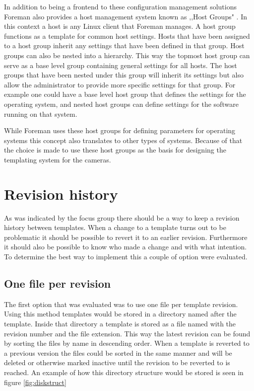 In addition to being a frontend to these configuration management solutions Foreman also provides a host management system known as ,,Host Groups" \cite{noauthor_foreman_nodate-1}. In this context a host is any Linux client that Foreman manages.
A host group functions as a template for common host settings.
Hosts that have been assigned to a host group inherit any settings that have been defined in that group.
Host groups can also be nested into a hierarchy.
This way the topmost host group can serve as a base level group containing general settings for all hosts.
The host groups that have been nested under this group will inherit its settings but also allow the administrator to provide more specific settings for that group.
For example one could have a base level host group that defines the settings for the operating system, and nested host groups can define settings for the software running on that system.

While Foreman uses these host groups for defining parameters for operating systems this concept also translates to other types of systems.
Because of that the choice is made to use these host groups as the basis for designing the templating system for the cameras.

\section{Revision history}
As was indicated by the focus group there should be a way to keep a revision history between templates.
When a change to a template turns out to be problematic it should be possible to revert it to an earlier revision.
Furthermore it should also be possible to know who made a change and with what intention.
To determine the best way to implement this a couple of option were evaluated.

\subsection{One file per revision}
The first option that was evaluated was to use one file per template revision.
Using this method templates would be stored in a directory named after the template.
Inside that directory a template is stored as a file named with the revision number and the file extension.
This way the latest revision can be found by sorting the files by name in descending order.
When a template is reverted to a previous version the files could be sorted in the same manner and will be deleted or otherwise marked inactive until the revision to be reverted to is reached. An example of how this directory structure would be stored is seen in figure \ref{fig:diskstruct}

